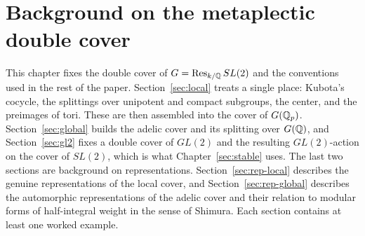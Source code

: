 %
%

\chapter{Background on the metaplectic double cover}\label{sec:background}

This chapter fixes the double cover of $G=\operatorname{Res}_{k/\mathbb{Q}}SL(2)$ and the
conventions used in the rest of the paper. Section~\ref{sec:local}
treats a single place: Kubota's cocycle, the splittings over unipotent
and compact subgroups, the center, and the preimages of tori. These are
then assembled into the cover of $G(\mathbb{Q}_p)$. Section~\ref{sec:global}
builds the adelic cover and its splitting over $G(\mathbb{Q})$, and
Section~\ref{sec:gl2} fixes a double cover of $GL(2)$ and the resulting
$GL(2)$-action on the cover of $SL(2)$, which is what
Chapter~\ref{sec:stable} uses. The last two sections are background on
representations. Section~\ref{sec:rep-local} describes the genuine
representations of the local cover, and Section~\ref{sec:rep-global}
describes the automorphic representations of the adelic cover and their
relation to modular forms of half-integral weight in the sense of
Shimura. Each section contains at least one worked example.

